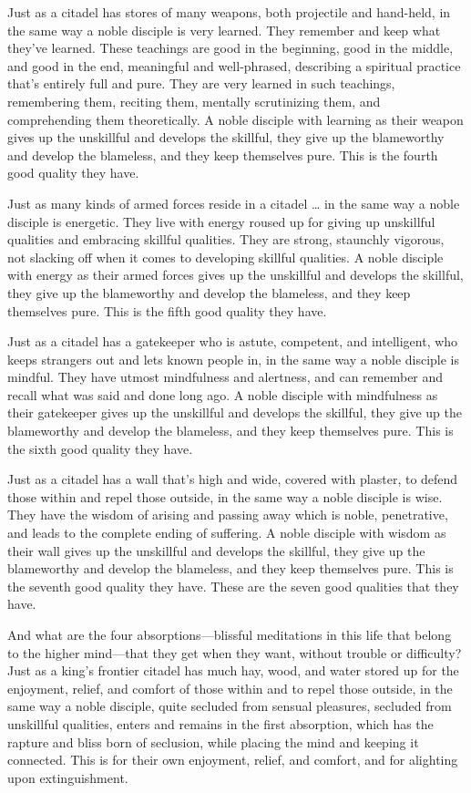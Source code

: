 \documentclass[12pt,openany]{book}%
\begin{document}
Just as a citadel has stores of many weapons, both projectile and hand-held, in the same way a noble disciple is very learned. They remember and keep what they’ve learned. These teachings are good in the beginning, good in the middle, and good in the end, meaningful and well-phrased, describing a spiritual practice that’s entirely full and pure. They are very learned in such teachings, remembering them, reciting them, mentally scrutinizing them, and comprehending them theoretically. A noble disciple with learning as their weapon gives up the unskillful and develops the skillful, they give up the blameworthy and develop the blameless, and they keep themselves pure. This is the fourth good quality they have. 

Just as many kinds of armed forces reside in a citadel … in the same way a noble disciple is energetic. They live with energy roused up for giving up unskillful qualities and embracing skillful qualities. They are strong, staunchly vigorous, not slacking off when it comes to developing skillful qualities. A noble disciple with energy as their armed forces gives up the unskillful and develops the skillful, they give up the blameworthy and develop the blameless, and they keep themselves pure. This is the fifth good quality they have. 

Just as a citadel has a gatekeeper who is astute, competent, and intelligent, who keeps strangers out and lets known people in, in the same way a noble disciple is mindful. They have utmost mindfulness and alertness, and can remember and recall what was said and done long ago. A noble disciple with mindfulness as their gatekeeper gives up the unskillful and develops the skillful, they give up the blameworthy and develop the blameless, and they keep themselves pure. This is the sixth good quality they have. 

Just as a citadel has a wall that’s high and wide, covered with plaster, to defend those within and repel those outside, in the same way a noble disciple is wise. They have the wisdom of arising and passing away which is noble, penetrative, and leads to the complete ending of suffering. A noble disciple with wisdom as their wall gives up the unskillful and develops the skillful, they give up the blameworthy and develop the blameless, and they keep themselves pure. This is the seventh good quality they have. These are the seven good qualities that they have. 

And what are the four absorptions—blissful meditations in this life that belong to the higher mind—that they get when they want, without trouble or difficulty? Just as a king’s frontier citadel has much hay, wood, and water stored up for the enjoyment, relief, and comfort of those within and to repel those outside, in the same way a noble disciple, quite secluded from sensual pleasures, secluded from unskillful qualities, enters and remains in the first absorption, which has the rapture and bliss born of seclusion, while placing the mind and keeping it connected. This is for their own enjoyment, relief, and comfort, and for alighting upon extinguishment. 
\end{document}
